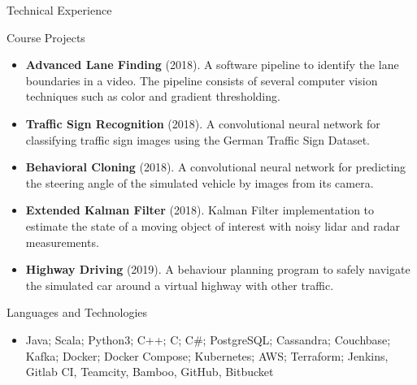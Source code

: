 \documentclass[]{cv}
\begin{document}
	\begin{cvsection}{Technical Experience}
		\begin{cvsubsection}{Course Projects}{}{}
			\begin{itemize}
				\item \textbf{Advanced Lane Finding} (2018). A software pipeline to identify the lane boundaries in a video. The pipeline consists of several computer vision techniques such as color and gradient thresholding.
				\item \textbf{Traffic Sign Recognition} (2018). A convolutional neural network for classifying traffic sign images using the German Traffic Sign Dataset.
				\item \textbf{Behavioral Cloning} (2018). A convolutional neural network for predicting the steering angle of the simulated vehicle by images from its camera.
				\item \textbf{Extended Kalman Filter} (2018). Kalman Filter implementation to estimate the state of a moving object of interest with noisy lidar and radar measurements.
				\item \textbf{Highway Driving} (2019). A behaviour planning program to safely navigate the simulated car around a virtual highway with other traffic.
			\end{itemize}
		\end{cvsubsection}
	\end{cvsection}

	\begin{cvsection}{Languages and Technologies}
		\begin{cvsubsection}{}{}{}
			\begin{itemize}
				\item Java; Scala; Python3; C++; C; C\#; PostgreSQL; Cassandra; Couchbase; Kafka; Docker; Docker Compose; Kubernetes; AWS; Terraform; Jenkins, Gitlab CI, Teamcity, Bamboo, GitHub, Bitbucket
			\end{itemize}
		\end{cvsubsection}
	\end{cvsection}
\end{document}
